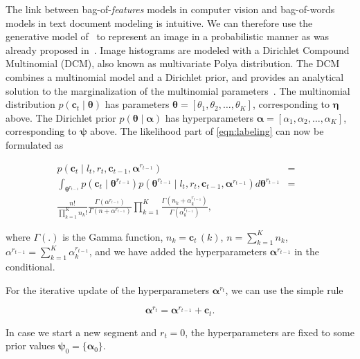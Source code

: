 The link between bag-of-\emph{features} models in computer vision and
bag-of-words models in text document modeling is intuitive. We can therefore use
the generative model of~\cite{madsen05modeling} to represent an image in a
probabilistic manner as was already proposed in~\cite{ranganathan09bayesian}.
Image histograms are modeled with a Dirichlet Compound Multinomial (DCM), also
known as multivariate Polya distribution. The DCM combines a multinomial model
and a Dirichlet prior, and provides an analytical solution to the
marginalization of the multinomial parameters~\cite{minka03estimating}. The
multinomial distribution $p(\mathbf{c}_t\mid\boldsymbol{\theta})$ has parameters
$\boldsymbol{\theta}=[\theta_1,\theta_2,\dots,\theta_K]$, corresponding to
$\boldsymbol{\eta}$ above. The Dirichlet prior
$p(\boldsymbol{\theta}\mid\boldsymbol{\alpha})$ has
hyperparameters $\boldsymbol{\alpha}=[\alpha_1,\alpha_2,\dots,\alpha_K]$,
corresponding to $\boldsymbol{\psi}$ above. The likelihood part of
\eqref{eqn:labeling} can now be formulated as

\begin{eqnarray}
\label{eqn:polya}
p(\mathbf{c}_t\mid l_t,r_t,\mathbf{c}_{t-1},\boldsymbol{\alpha}^{r_{t-1}})
&=&\\\nonumber
\int_{\boldsymbol{\theta}^{r_{t-1}}}
p(\mathbf{c}_{t}\mid\boldsymbol{\theta}^{r_{t-1}})
p(\boldsymbol{\theta}^{r_{t-1}}\mid
l_t,r_t,\mathbf{c}_{t-1},\boldsymbol{\alpha}^{r_{t-1}})
d\boldsymbol{\theta}^{r_{t-1}}
&=&\\\nonumber\frac{n!}{\prod_{k=1}^K n_k!}\frac{\Gamma(\alpha^{r_{t-1}})}
{\Gamma(n+\alpha^{r_{t-1}})}\prod_{k=1}^K\frac{\Gamma(n_k+\alpha^{r_{t-1}}_k)}
{\Gamma(\alpha^{r_{t-1}}_k)},
\end{eqnarray}

where $\Gamma(.)$ is the Gamma function, $n_k=\mathbf{c}_t\,(k)$,
$n=\sum_{k=1}^K n_k$,
$\alpha^{r_{t-1}}=\sum_{k=1}^K\alpha^{r_{t-1}}_k$, and we have added the
hyperparameters $\boldsymbol{\alpha}^{r_{t-1}}$ in the conditional.

For the iterative update of the hyperparameters $\boldsymbol{\alpha}^{r_t}$, we
can use the simple rule

\begin{equation}
\label{eqn:alpha_update}
\boldsymbol{\alpha}^{r_t} = \boldsymbol{\alpha}^{r_{t-1}} + \mathbf{c}_{t}.
\end{equation}

In case we start a new segment and $r_t=0$, the hyperparameters are fixed to
some prior values $\boldsymbol{\psi}_0=\{\boldsymbol{\alpha}_0\}$.
